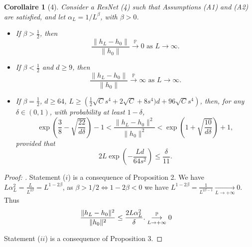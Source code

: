 \documentclass{report}
\theoremstyle{plain}%
\newtheorem*{cor}{Corollaire}
\theoremstyle{definition}
\theoremstyle{remark}
\begin{document}
\begin{cor}[4]
    Consider a ResNet (4) such that Assumptions (A1) and (A2) are satisfied, and let $\alpha_L = 1/L^\beta$, with $\beta > 0$.
\begin{itemize}
    \item[(i)] If $\beta > \frac{1}{2}$, then
    \[
    \frac{\|h_L - h_0\|}{\|h_0\|} \xrightarrow{\mathbb{P}} 0 \text{ as } L \to \infty.
    \]
    \item[(ii)] If $\beta < \frac{1}{2}$ and $d \geq 9$, then
    \[
    \frac{\|h_L - h_0\|}{\|h_0\|} \xrightarrow{\mathbb{P}} \infty \text{ as } L \to \infty.
    \]
    \item[(iii)] If $\beta = \frac{1}{2}$, $d \geq 64$, $L \geq \left(\frac{1}{2}\sqrt{C}s^4 + 2\sqrt{C} + 8s^4)d + 96\sqrt{C}s^4\right)$, then, for any $\delta \in (0, 1)$, with probability at least $1 - \delta$,
    \[
    \exp\left(\frac{3}{8} - \sqrt{\frac{22}{d\delta}}\right) - 1 < \frac{\|h_L - h_0\|^2}{\|h_0\|^2} < \exp\left(1 + \sqrt{\frac{10}{d\delta}}\right) + 1,
    \]
    provided that
    \[
    2L \exp\left(-\frac{Ld}{64s^2}\right) \leq \frac{\delta}{11}.
    \]
\end{itemize}

\end{cor}
\begin{proof}[Proof: ]
    Statement ($ i $) is a consequence of Proposition 2. We have $ L \alpha _L ^2 = \frac{L}{L^{2\beta} } = L^{1 - 2 \beta } $, as $ \beta > 1/2 \Leftrightarrow 1 - 2 \beta < 0$ we have $L^{1 - 2 \beta } = \frac{1}{L^{2 \beta  -1}} \underset{L\to +\infty}{\longrightarrow} 0 $. Thus
    \begin{align*}
        & \frac{\|h_L - h_0\|^2}{\|h_0\|^2} \leq \frac{2L\alpha_L^2}{\delta}.
        \overunderset{\mathbb{P}}{L\to +\infty}{\longrightarrow} 0 
    \end{align*}

    Statement ($ ii $) is a consequence of Proposition 3.


\end{proof}
\end{document}
